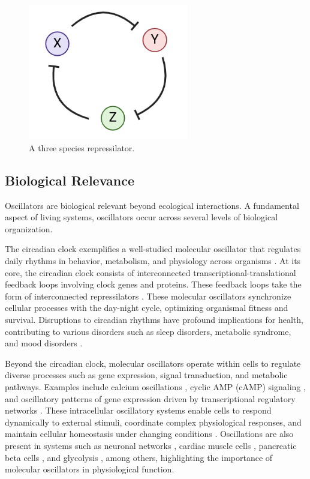 \documentclass[12pt]{report}
\begin{document}
\begin{figure}
    \centering
    \includegraphics[width=7cm]{images/repressilator.png}
    \caption[Three node repressilator]{A three species repressilator.}
    \label{fig:repressilator}
\end{figure}

\subsection{Biological Relevance}
Oscillators are biological relevant beyond ecological interactions. A fundamental aspect of living systems, oscillators occur across several levels of biological organization. 

The circadian clock exemplifies a well-studied molecular oscillator that regulates daily rhythms in behavior, metabolism, and physiology across organisms \cite{circadianReview, circadianOverview}. At its core, the circadian clock consists of interconnected transcriptional-translational feedback loops involving clock genes and proteins. These feedback loops take the form of interconnected repressilators \cite{YAMASHINO2013, Pett2016}. These molecular oscillators synchronize cellular processes with the day-night cycle, optimizing organismal fitness and survival. Disruptions to circadian rhythms have profound implications for health, contributing to various disorders such as sleep disorders, metabolic syndrome, and mood disorders \cite{circadianReview}.


Beyond the circadian clock, molecular oscillators operate within cells to regulate diverse processes such as gene expression, signal transduction, and metabolic pathways. Examples include calcium oscillations \cite{Smedler2014}, cyclic AMP (cAMP) signaling \cite{Dyachok2006}, and oscillatory patterns of gene expression driven by transcriptional regulatory networks \cite{Cerone2012}. These intracellular oscillatory systems enable cells to respond dynamically to external stimuli, coordinate complex physiological responses, and maintain cellular homeostasis under changing conditions \cite{Cheong2010, Jolma2010}. Oscillations are also present in systems such as neuronal networks \cite{Cebolla2019}, cardiac muscle cells \cite{Weiss2010, Montano2001}, pancreatic beta cells \cite{Watts2014}, and glycolysis \cite{Ghosh1964}, among others, highlighting the importance of molecular oscillators in physiological function.
\end{document}
